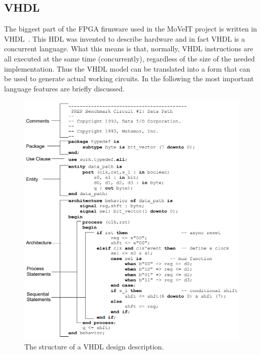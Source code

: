 \subsection{VHDL}
\noindent The biggest part of the FPGA firmware used in the MoVeIT project is written in VHDL~\cite{vhdl}. This HDL was invented to describe hardware and in fact VHDL is a concurrent language. What this means is that, normally, VHDL instructions are all executed at the same time (concurrently), regardless of the size of the needed implementation. Thus the VHDL model can be translated into a form that can be used to generate actual working circuits. In the following the most important language features are briefly discussed. 
\begin{figure}[H]
	\centering
	\includegraphics[width=0.6\linewidth]{IMG/ch3/VHDL}
	\caption{The structure of a VHDL design description.}
	\label{fig:vhdl}
\end{figure}

